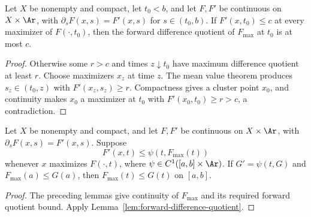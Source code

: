 \begin{lemma}
\label{lem:forward-difference-maximum-product}
\leanok



Let $X$ be nonempty and compact, let $t_0<b$, and let $F,F'$ be
continuous on $X\times\Ar$, with
$\partial_sF(x,s)=F'(x,s)$ for $s\in(t_0,b)$. If
$F'(x,t_0)\le c$ at every maximizer of $F(\cdot,t_0)$, then the
forward difference quotient of $F_{\max}$ at $t_0$ is at most $c$.
\end{lemma}
\begin{proof}
\sketch
\leanok
{}
Otherwise some $r>c$ and times $z\downarrow t_0$ have maximum
difference quotient at least $r$. Choose maximizers $x_z$ at time $z$.
The mean value theorem produces $s_z\in(t_0,z)$ with
$F'(x_z,s_z)\ge r$. Compactness gives a cluster point $x_0$, and
continuity makes $x_0$ a maximizer at $t_0$ with
$F'(x_0,t_0)\ge r>c$, a contradiction.
\end{proof}

\begin{corollary}
\label{cor:forward-difference-maximum-product}



Let $X$ be nonempty and compact, and let $F,F'$ be continuous on
$X\times\Ar$, with $\partial_sF(x,s)=F'(x,s)$. Suppose
$$F'(x,t)\le\psi(t,F_{\max}(t))$$
whenever $x$ maximizes $F(\cdot,t)$, where
$\psi\in C^1([a,b]\times\Ar)$. If $G'=\psi(t,G)$ and
$F_{\max}(a)\le G(a)$, then $F_{\max}(t)\le G(t)$ on $[a,b]$.
\end{corollary}
\begin{proof}
\sketch
\leanok
{}
The preceding lemmas give continuity of $F_{\max}$ and its required
forward quotient bound. Apply
Lemma~\ref{lem:forward-difference-quotient}.
\end{proof}

